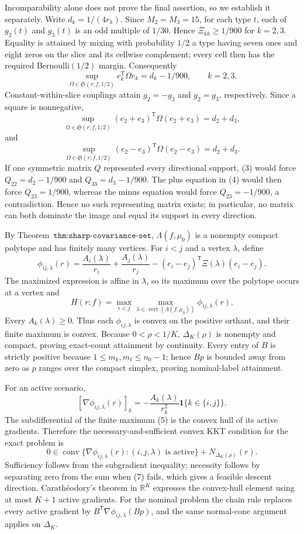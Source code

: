 Incomparability alone does not prove the final assertion, so we establish it separately. Write \(d_k=1/(4r_k)\). Since \(M_2=M_3=15\), for each type \(t\), each of \(g_2(t)\) and \(g_3(t)\) is an odd multiple of \(1/30\). Hence \(\Xi_{kk}\ge1/900\) for \(k=2,3\). Equality is attained by mixing with probability \(1/2\) a type having seven ones and eight zeros on the slice and its cellwise complement; every cell then has the required Bernoulli\((1/2)\) margin. Consequently
\[
\sup_{\Omega\in\mathfrak S(r;f,1/2)}e_k^{\mathsf T}\Omega e_k=d_k-1/900,\qquad k=2,3.
\tag{3}
\]
Constant-within-slice couplings attain \(g_2=-g_3\) and \(g_2=g_3\), respectively. Since a square is nonnegative,
\[
\sup_{\Omega\in\mathfrak S(r;f,1/2)}(e_2+e_3)^{\mathsf T}\Omega(e_2+e_3)=d_2+d_3,
\]
and
\[
\sup_{\Omega\in\mathfrak S(r;f,1/2)}(e_2-e_3)^{\mathsf T}\Omega(e_2-e_3)=d_2+d_3.
\tag{4}
\]
If one symmetric matrix \(Q\) represented every directional support, (3) would force \(Q_{22}=d_2-1/900\) and \(Q_{33}=d_3-1/900\). The plus equation in (4) would then force \(Q_{23}=1/900\), whereas the minus equation would force \(Q_{23}=-1/900\), a contradiction. Hence no such representing matrix exists; in particular, no matrix can both dominate the image and equal its support in every direction.

By Theorem~\(\texttt{thm:sharp-covariance-set}\), \(\Lambda(f,\mu_0)\) is a nonempty compact polytope and has finitely many vertices. For \(i<j\) and a vertex \(\lambda\), define
\[
\phi_{ij,\lambda}(r)=\frac{A_i(\lambda)}{r_i}+\frac{A_j(\lambda)}{r_j}-(e_i-e_j)^{\mathsf T}\Xi(\lambda)(e_i-e_j).
\]
The maximized expression is affine in \(\lambda\), so its maximum over the polytope occurs at a vertex and
\[
H(r;f)=\max_{i<j}\max_{\lambda\in\operatorname{vert}(\Lambda(f,\mu_0))}\phi_{ij,\lambda}(r).
\tag{5}
\]
Every \(A_k(\lambda)\ge0\). Thus each \(\phi_{ij,\lambda}\) is convex on the positive orthant, and their finite maximum is convex. Because \(0<\rho<1/K\), \(\Delta_K(\rho)\) is nonempty and compact, proving exact-count attainment by continuity. Every entry of \(B\) is strictly positive because \(1\le m_k,m_\ell\le n_0-1\); hence \(Bp\) is bounded away from zero as \(p\) ranges over the compact simplex, proving nominal-label attainment.

For an active scenario,
\[
[\nabla\phi_{ij,\lambda}(r)]_k=-\frac{A_k(\lambda)}{r_k^2}\mathbf1\{k\in\{i,j\}\}.
\tag{6}
\]
The subdifferential of the finite maximum (5) is the convex hull of its active gradients. Therefore the necessary-and-sufficient convex KKT condition for the exact problem is
\[
0\in\operatorname{conv}\{\nabla\phi_{ij,\lambda}(r):(i,j,\lambda)\text{ is active}\}+N_{\Delta_K(\rho)}(r).
\tag{7}
\]
Sufficiency follows from the subgradient inequality; necessity follows by separating zero from the sum when (7) fails, which gives a feasible descent direction. Carath\'eodory's theorem in \(\mathbb R^K\) expresses the convex-hull element using at most \(K+1\) active gradients. For the nominal problem the chain rule replaces every active gradient by \(B^{\mathsf T}\nabla\phi_{ij,\lambda}(Bp)\), and the same normal-cone argument applies on \(\Delta_K\).

